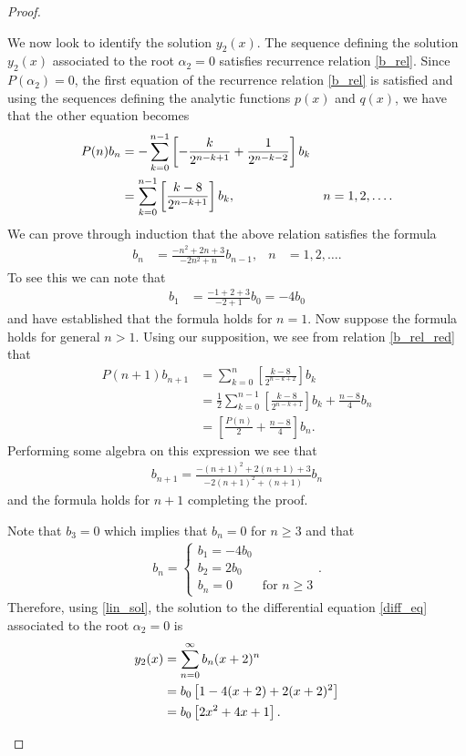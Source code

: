 \documentclass[12pt]{article}
\theoremstyle{definition}
\begin{document}
\begin{proof}
\begin{enumerate}
      We now look to identify the solution $y_2(x)$.
      The sequence defining the solution $y_2(x)$ associated to the root $\alpha_2 = 0$ satisfies recurrence relation \eqref{b_rel}.
      Since $P(\alpha_2) = 0$, the first equation of the recurrence relation \eqref{b_rel} is satisfied and
      using the sequences defining the analytic functions $p(x)$ and $q(x)$, we have that the other equation becomes
      \begin{align}\label{b_rel_red}
        P(n) b_n &= -\sum_{k=0}^{n-1}\left[-\frac{k}{2^{n-k+1}} + \frac{1}{2^{n-k-2}}\right]b_k & & \notag\\
        &=\sum_{k=0}^{n-1}\left[\frac{k-8}{2^{n-k+1}}\right]b_k, &n&=1,2,\dots.
      \end{align}
      We can prove through induction that the above relation satisfies the formula
      \begin{align*}
        b_n &= \frac{-n^2+2n+3}{-2n^2+n}b_{n-1}, &n&=1,2,\dots.
      \end{align*}
      To see this we can note that
      \begin{align*}
        b_1 &= \frac{-1 +2 +3}{-2 + 1}b_0 = -4b_0
      \end{align*}
      and have established that the formula holds for $n=1$. Now suppose the formula
      holds for general $n > 1$. Using our supposition, we see from relation \eqref{b_rel_red} that
      \begin{align*}
        P(n + 1) b_{n+1} &= \sum_{k=0}^{n}\left[\frac{k-8}{2^{n-k+2}}\right]b_k \\
        &= \frac{1}{2}\sum_{k=0}^{n-1}\left[\frac{k-8}{2^{n-k+1}}\right]b_k + \frac{n-8}{4}b_n \\
        &= \left[\frac{P(n)}{2} + \frac{n-8}{4}\right]b_n.
      \end{align*}
      Performing some algebra on this expression we see that
      \begin{align*}
        b_{n+1} = \frac{-(n+1)^2+2(n+1)+3}{-2(n+1)^2+(n+1)}b_{n}
      \end{align*}
      and the formula holds for $n+1$ completing the proof.

      Note that $b_3 = 0$ which implies that $b_n = 0$ for $n\geq 3$ and that
      \begin{align*}
        b_n =
        \begin{cases}
          b_1 = -4b_0 \\
          b_2 = 2b_0 \\
          b_n = 0 &\text{for $n\geq 3$}
        \end{cases}.
      \end{align*}
      Therefore, using \eqref{lin_sol}, the solution to the differential equation \eqref{diff_eq} associated to the root $\alpha_2 = 0$
      is
      \begin{align}\label{y2_sol}
        y_2(x) &= \sum_{n=0}^\infty b_n(x+2)^{n} \notag \\
        &= b_0\left[1 -4(x+2) +2(x+2)^2\right]\notag\\
        &= b_0\left[2x^2+4x+1\right].
      \end{align}


\end{enumerate}
\end{proof}
\end{document}
